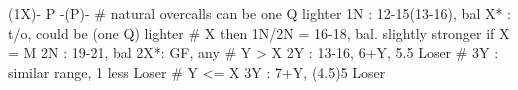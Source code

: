 (1X)- P -(P)- 
# natural overcalls can be one Q lighter
1N : 12-15(13-16), bal
X* : t/o, could be (one Q) lighter  
# X then 1N/2N = 16-18, bal. slightly stronger if X = M
2N : 19-21, bal
2X*: GF, any
# Y > X
2Y : 13-16, 6+Y, 5.5 Loser  # 3Y : similar range, 1 less Loser
# Y <= X
3Y : 7+Y, (4.5)5 Loser
